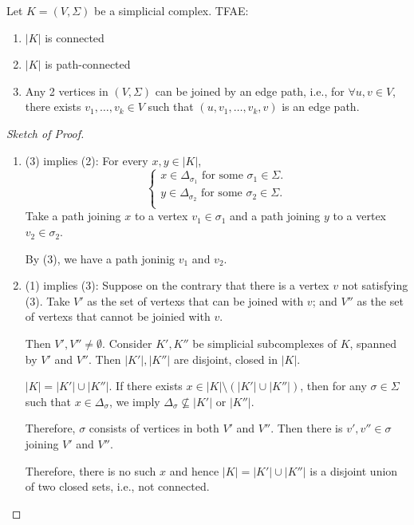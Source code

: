 \begin{proposition}[Connectedness]
Let $K=(V,\Sigma)$ be a simplicial complex. TFAE:
\begin{enumerate}
\item
$|K|$ is connected
\item
$|K|$ is path-connected
\item
Any 2 vertices in $(V,\Sigma)$ can be joined by an edge path, i.e., for $\forall u,v\in V$, there exists $v_1,\dots,v_k\in V$ such that $(u,v_1,\dots,v_k,v)$ is an edge path.
\end{enumerate}
\end{proposition}

\begin{proof}[Sketch of Proof]
\begin{enumerate}
\item
(3) implies (2):
For every $x,y\in|K|$, 
\[
\left\{
\begin{aligned}
x\in\Delta_{\sigma_1}\text{ for some $\sigma_1\in\Sigma$.}\\
y\in\Delta_{\sigma_2}\text{ for some $\sigma_2\in\Sigma$.}\\
\end{aligned}
\right.
\]
Take a path joining $x$ to a vertex $v_1\in\sigma_1$ and a path joining $y$ to a vertex $v_2\in\sigma_2$.

By (3), we have a path joninig $v_1$ and $v_2$.
\item
(1) implies (3):
Suppose on the contrary that there is a vertex $v$ not satisfying (3).
Take $V'$ as the set of vertexs that can be joined with $v$; and $V''$ as the set of vertexs that cannot be joinied with $v$.

Then $V',V''\ne\emptyset$.
Consider $K',K''$ be simplicial subcomplexes of $K$, spanned by $V'$ and $V''$.
Then $|K'|,|K''|$ are disjoint, closed in $|K|$.

$|K| = |K'|\cup|K''|$. 
If there exists $x\in |K|\setminus(|K'|\cup|K''|)$, then for any $\sigma\in\Sigma$ such that $x\in\Delta_{\sigma}$, we imply $\Delta_\sigma\not\subseteq |K'|$ or $|K''|$.

Therefore, $\sigma$ consists of vertices in both $V'$ and $V''$.
Then there is $v',v''\in\sigma$ joining $V'$ and $V''$.

Therefore, there is no such $x$ and hence $|K|=|K'|\cup|K''|$ is a disjoint union of two closed sets, i.e., not connected.
\end{enumerate}
\end{proof}

